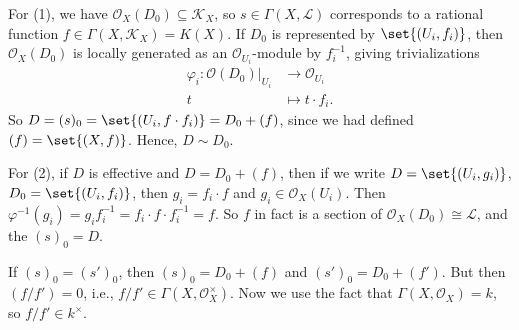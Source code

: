For (1), we have $\mathcal{O}_X(D_0) \subseteq \mathcal{K}_X$, so $s \in \Gamma(X, \mathcal{L})$ corresponds
to a rational function $f \in \Gamma(X, \mathcal{K}_X) = K(X)$. If $D_0$ is represented by
$\set{(U_i, f_i)}$, then $\mathcal{O}_X(D_0)$ is locally generated as an $\mathcal{O}_{U_i}$-module by
$f_i^{-1}$, giving trivializations
\begin{align*}
	\varphi_i\colon \mathcal{O}(D_0)|_{U_i}&\to \mathcal{O}_{U_i}\\
	t&\mapsto t\cdot f_i.
\end{align*}
So $D = (s)_0 = \set{(U_i, f\cdot f_i)} = D_0 + (f)$, since we had defined $(f) = \set{(X, f)}$.
Hence, $D\sim D_0$.

For (2), if $D$ is effective and $D = D_0 + (f)$, then if we write $D = \set{(U_i, g_i)}$,
$D_0 = \set{(U_i, f_i)}$, then $g_i = f_i \cdot f$ and $g_i \in \mathcal{O}_X(U_i)$.
Then $\varphi^{-1}(g_i) = g_if_i^{-1} = f_i\cdot f\cdot f_i^{-1} = f$. So $f$ in
fact is a section of $\mathcal{O}_X(D_0) \cong \mathcal{L}$, and the
$(s)_0 = D$.

If $(s)_0 = (s')_0$, then $(s)_0 = D_0 + (f)$ and $(s')_0 = D_0 + (f')$. But then
$(f/f') = 0$, i.e., $f/f' \in \Gamma(X, \mathcal{O}_X^\times)$. Now we use the
fact that $\Gamma(X, \mathcal{O}_X) = k$, so $f/f' \in k^\times$.
